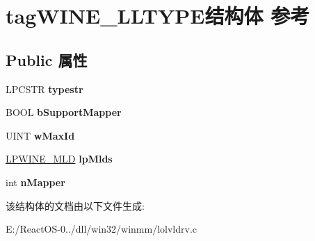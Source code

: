 \hypertarget{structtag_w_i_n_e___l_l_t_y_p_e}{}\section{tag\+W\+I\+N\+E\+\_\+\+L\+L\+T\+Y\+P\+E结构体 参考}
\label{structtag_w_i_n_e___l_l_t_y_p_e}
\subsection*{Public 属性}
\begin{DoxyCompactItemize}
\item 
\mbox{\label{structtag_w_i_n_e___l_l_t_y_p_e_a0e8c81676ca9d990a3186f7ac332e857}} 
L\+P\+C\+S\+TR {\bfseries typestr}
\item 
\mbox{\label{structtag_w_i_n_e___l_l_t_y_p_e_a5f7c25c4ad85b905dd1460c8c5899c78}} 
B\+O\+OL {\bfseries b\+Support\+Mapper}
\item 
\mbox{\label{structtag_w_i_n_e___l_l_t_y_p_e_afcff163286019228482c67418c224db9}} 
U\+I\+NT {\bfseries w\+Max\+Id}
\item 
\mbox{\label{structtag_w_i_n_e___l_l_t_y_p_e_af9709e3073a2952ce0a8cb380c1eac53}} 
\hyperlink{structtag_w_i_n_e___m_l_d}{L\+P\+W\+I\+N\+E\+\_\+\+M\+LD} {\bfseries lp\+Mlds}
\item 
\mbox{\label{structtag_w_i_n_e___l_l_t_y_p_e_aa8467068b1f828540dd0efd93fcd4702}} 
int {\bfseries n\+Mapper}
\end{DoxyCompactItemize}


该结构体的文档由以下文件生成\+:\begin{DoxyCompactItemize}
\item 
E\+:/\+React\+O\+S-\/0../dll/win32/winmm/lolvldrv.\+c\end{DoxyCompactItemize}

